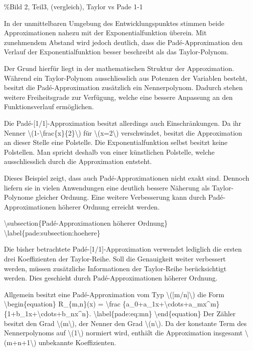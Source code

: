 \%Bild 2, Teil3, (vergleich), Taylor vs Pade 1-1

In der unmittelbaren Umgebung des Entwicklungspunktes stimmen beide
Approximationen nahezu mit der Exponentialfunktion überein. Mit
zunehmendem Abstand wird jedoch deutlich, dass die Padé-Approximation
den Verlauf der Exponentialfunktion besser beschreibt als das
Taylor-Polynom.

Der Grund hierfür liegt in der mathematischen Struktur der
Approximation. Während ein Taylor-Polynom ausschliesslich aus Potenzen
der Variablen besteht, besitzt die Padé-Approximation zusätzlich ein
Nennerpolynom. Dadurch stehen weitere Freiheitsgrade zur Verfügung,
welche eine bessere Anpassung an den Funktionsverlauf ermöglichen.

Die Padé-{[}1/1{]}-Approximation besitzt allerdings auch
Einschränkungen. Da ihr Nenner
\textbackslash(1-\textbackslash frac\{x\}\{2\}\textbackslash) für
\textbackslash(x=2\textbackslash) verschwindet, besitzt die
Approximation an dieser Stelle eine Polstelle. Die Exponentialfunktion
selbst besitzt keine Polstellen. Man spricht deshalb von einer
künstlichen Polstelle, welche ausschliesslich durch die Approximation
entsteht.

Dieses Beispiel zeigt, dass auch Padé-Approximationen nicht exakt sind.
Dennoch liefern sie in vielen Anwendungen eine deutlich bessere Näherung
als Taylor-Polynome gleicher Ordnung. Eine weitere Verbesserung kann
durch Padé-Approximationen höherer Ordnung erreicht werden.

\textbackslash subsection\{Padé-Approximationen höherer Ordnung\}
\textbackslash label\{pade:subsection:hoehere\}

Die bisher betrachtete Padé-{[}1/1{]}-Approximation verwendet lediglich
die ersten drei Koeffizienten der Taylor-Reihe. Soll die Genauigkeit
weiter verbessert werden, müssen zusätzliche Informationen der
Taylor-Reihe berücksichtigt werden. Dies geschieht durch
Padé-Approximationen höherer Ordnung.

Allgemein besitzt eine Padé-Approximation vom Typ
\textbackslash({[}m/n{]}\textbackslash) die Form
\textbackslash begin\{equation\} R\_\{m,n\}(x) = \textbackslash frac
\{a\_0+a\_1x+\textbackslash cdots+a\_mx\^{}m\}
\{1+b\_1x+\textbackslash cdots+b\_nx\^{}n\}.
\textbackslash label\{pade:eq:mn\} \textbackslash end\{equation\} Der
Zähler besitzt den Grad \textbackslash(m\textbackslash), der Nenner den
Grad \textbackslash(n\textbackslash). Da der konstante Term des
Nennerpolynoms auf \textbackslash(1\textbackslash) normiert wird,
enthält die Approximation insgesamt \textbackslash(m+n+1\textbackslash)
unbekannte Koeffizienten.

